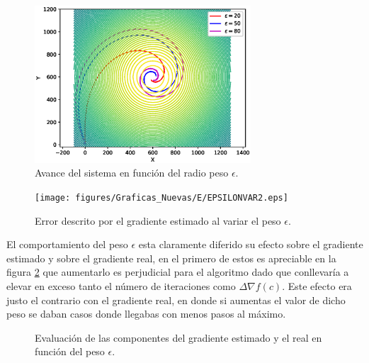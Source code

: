 \begin{figure}[H]
\centering
\includegraphics[width=0.72\textwidth]{figures/Epsilon_variante/Figure_1.eps}
\caption{Avance del sistema en función del radio peso $\epsilon$.} \label{Epsilon_Var}
\end{figure}

\begin{figure}[H]
\centering
\texttt{[image: figures/Graficas\_Nuevas/E/EPSILONVAR2.eps]}
\caption{Error descrito por el gradiente estimado al variar el peso $\epsilon$.} \label{Epsilon_Var_Error}
\end{figure}

El comportamiento del peso $\epsilon$ esta claramente diferido su efecto sobre el gradiente estimado y sobre el gradiente real, en el primero de estos es apreciable  en la figura \ref{Epsilon_Var_Error} que aumentarlo es perjudicial para el algoritmo dado que conllevaría a elevar en exceso tanto el número de iteraciones como $\Delta{\nabla{f\left(c\right)}}$. Este efecto era justo el contrario con el gradiente real, en donde si aumentas el valor de dicho peso se daban casos donde llegabas con menos pasos al máximo.

\begin{figure}[H]
  \begin{center}
    \caption{Evaluación de las componentes del gradiente estimado y el real en función del peso $\epsilon$.}
    \label{Gradiente_Var_Epsilon}
  \end{center}
\end{figure}


